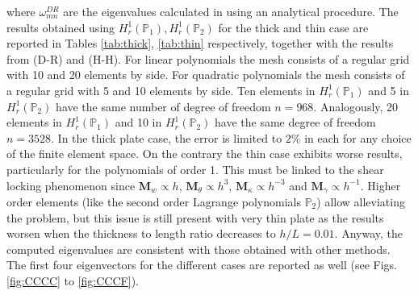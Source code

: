 \documentclass[preprint,12pt]{elsarticle}
\begin{document}
{where $\omega_{mn}^{DR}$ are the eigenvalues calculated in \cite{dawe1980rayleigh} using an analytical procedure. The results obtained using $H_r^1(\mathbb{P}_1), H_r^1(\mathbb{P}_2)$ for the thick and thin case are reported in Tables \ref{tab:thick}, \ref{tab:thin} respectively, together with the results from \cite{dawe1980rayleigh} (D-R) and \cite{huang1984nine} (H-H). For linear polynomials the mesh consists of a regular grid with 10 and 20 elements by side. For quadratic polynomials the mesh consists of a regular grid with 5 and 10 elements by side. Ten elements in $H_r^1(\mathbb{P}_1)$ and 5 in $H_r^1(\mathbb{P}_2)$ have the same number of degree of freedom $n=968$. Analogously, 20 elements in $H_r^1(\mathbb{P}_1)$ and 10 in $H_r^1(\mathbb{P}_2)$ have the same degree of freedom $n=3528$.  In the thick plate case,  the error is limited to $2\%$ in each for any choice of the finite element space.  On the contrary the thin case exhibits worse results, particularly for the polynomials of order 1. This must be linked to the shear locking phenomenon since $\bm{M}_{w} \propto h$, $\bm{M}_{\theta} \propto h^3$, $\bm{M}_{\kappa} \propto h^{-3}$ and $\bm{M}_{\gamma} \propto h^{-1}$. Higher order elements (like the second order Lagrange polynomials $\mathbb{P}_2$) allow alleviating the problem, but this issue is still present with very thin plate as the results worsen when the thickness to length ratio decreases to $h/L = 0.01$. Anyway, the computed eigenvalues are consistent with those obtained with other methods. The first four eigenvectors for the different cases are reported as well (see Figs. \ref{fig:CCCC} to \ref{fig:CCCF}).
}
\end{document}
